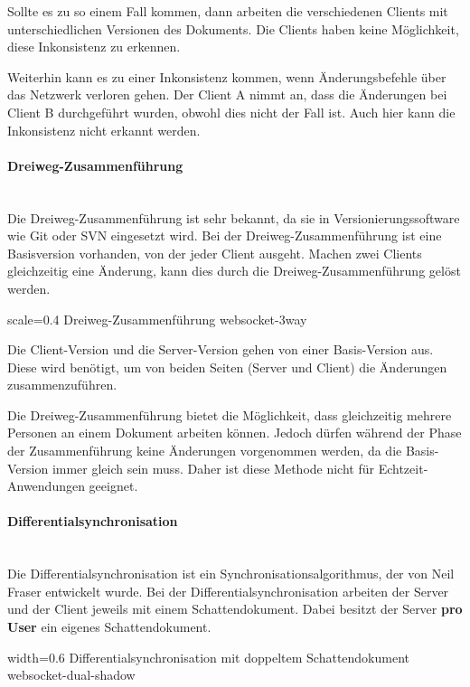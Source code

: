 Sollte es zu so einem Fall kommen, dann arbeiten die verschiedenen Clients mit unterschiedlichen Versionen des Dokuments. Die Clients haben keine Möglichkeit, diese Inkonsistenz zu erkennen.

Weiterhin kann es zu einer Inkonsistenz kommen, wenn Änderungsbefehle über das Netzwerk verloren gehen. Der Client A nimmt an, dass die Änderungen bei Client B durchgeführt wurden, obwohl dies nicht der Fall ist. Auch hier kann die Inkonsistenz nicht erkannt werden.

\paragraph{Dreiweg-Zusammenführung}~\\
Die Dreiweg-Zusammenführung ist sehr bekannt, da sie in Versionierungssoftware wie Git oder SVN eingesetzt wird. Bei der Dreiweg-Zusammenführung ist eine Basisversion vorhanden, von der jeder Client ausgeht. Machen zwei Clients gleichzeitig eine Änderung, kann dies durch die Dreiweg-Zusammenführung gelöst werden.

{scale=0.4}
{Dreiweg-Zusammenführung}
{websocket-3way}


Die Client-Version und die Server-Version gehen von einer Basis-Version aus. Diese wird benötigt, um von beiden Seiten (Server und Client) die Änderungen zusammenzuführen.

Die Dreiweg-Zusammenführung bietet die Möglichkeit, dass gleichzeitig mehrere Personen an einem Dokument arbeiten können. Jedoch dürfen während der Phase der Zusammenführung keine Änderungen vorgenommen werden, da die Basis-Version immer gleich sein muss. Daher ist diese Methode nicht für Echtzeit-Anwendungen geeignet.

\newpage
\paragraph{Differentialsynchronisation}~\\
Die Differentialsynchronisation ist ein Synchronisationsalgorithmus, der von Neil Fraser entwickelt wurde. \cite{websocket-differential} Bei der Differentialsynchronisation arbeiten der Server und der Client jeweils mit einem Schattendokument. Dabei besitzt der Server \textbf{pro User} ein eigenes Schattendokument. 

{width=0.6\textwidth}
{Differentialsynchronisation mit doppeltem Schattendokument \cite{websocket-differential}}
{websocket-dual-shadow}

